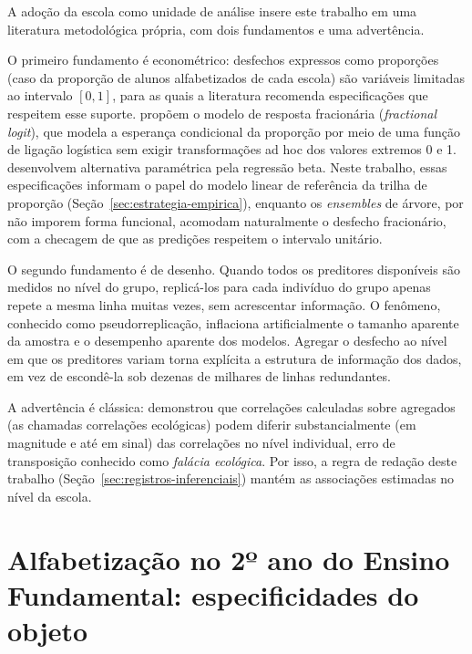 A adoção da escola como unidade de análise insere este trabalho em uma
literatura metodológica própria, com dois fundamentos e uma advertência.

O primeiro fundamento é econométrico: desfechos expressos como proporções
(caso da proporção de alunos alfabetizados de cada escola) são
variáveis limitadas ao intervalo $[0,1]$, para as quais a literatura
recomenda especificações que respeitem esse suporte.
 propõem o modelo de resposta fracionária
(\textit{fractional logit}), que modela a esperança condicional da
proporção por meio de uma função de ligação logística sem exigir
transformações ad hoc dos valores extremos 0 e 1.
 desenvolvem alternativa paramétrica pela
regressão beta. Neste trabalho, essas especificações informam o papel do
modelo linear de referência da trilha de proporção
(Seção~\ref{sec:estrategia-empirica}), enquanto os \textit{ensembles} de
árvore, por não imporem forma funcional, acomodam naturalmente o desfecho
fracionário, com a checagem de que as predições respeitem o intervalo
unitário.

O segundo fundamento é de desenho. Quando todos os preditores disponíveis
são medidos no nível do grupo, replicá-los para cada indivíduo do grupo
apenas repete a mesma linha muitas vezes, sem acrescentar informação. O
fenômeno, conhecido como pseudorreplicação, inflaciona artificialmente o
tamanho aparente da amostra e o desempenho aparente dos modelos. Agregar o
desfecho ao nível em que os preditores variam torna explícita a estrutura
de informação dos dados, em vez de escondê-la sob dezenas de milhares de
linhas redundantes.

A advertência é clássica:  demonstrou
que correlações calculadas sobre agregados (as chamadas correlações
ecológicas) podem diferir substancialmente (em magnitude e até em sinal)
das correlações no nível individual, erro de transposição conhecido
como \emph{falácia ecológica}. Por isso, a regra de redação deste
trabalho (Seção~\ref{sec:registros-inferenciais}) mantém as associações
estimadas no nível da escola.

\section{Alfabetização no 2º ano do Ensino Fundamental: especificidades do objeto}
\label{sec:alfabetizacao-2ef}

